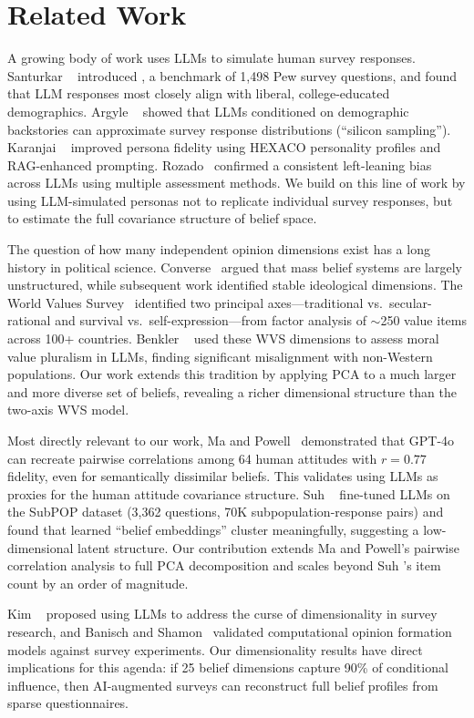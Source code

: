 \section{Related Work}
\label{sec:related}

A growing body of work uses LLMs to simulate human survey responses.
Santurkar \etal~\cite{santurkar2023whose} introduced \opinionqa, a benchmark of 1,498 Pew survey questions, and found that LLM responses most closely align with liberal, college-educated demographics.
Argyle \etal~\cite{argyle2023out} showed that LLMs conditioned on demographic backstories can approximate survey response distributions (``silicon sampling'').
Karanjai \etal~\cite{karanjai2025synthesizing} improved persona fidelity using HEXACO personality profiles and RAG-enhanced prompting.
Rozado~\cite{rozado2025measuring} confirmed a consistent left-leaning bias across LLMs using multiple assessment methods.
We build on this line of work by using LLM-simulated personas not to replicate individual survey responses, but to estimate the full covariance structure of belief space.

The question of how many independent opinion dimensions exist has a long history in political science.
Converse~\cite{converse1964nature} argued that mass belief systems are largely unstructured, while subsequent work identified stable ideological dimensions.
The World Values Survey~\cite{inglehart2005modernization} identified two principal axes---traditional vs.\ secular-rational and survival vs.\ self-expression---from factor analysis of $\sim$250 value items across 100+ countries.
Benkler \etal~\cite{benkler2023assessing} used these WVS dimensions to assess moral value pluralism in LLMs, finding significant misalignment with non-Western populations.
Our work extends this tradition by applying PCA to a much larger and more diverse set of \nbeliefs beliefs, revealing a richer dimensional structure than the two-axis WVS model.

Most directly relevant to our work, Ma and Powell~\cite{ma2025llm} demonstrated that GPT-4o can recreate pairwise correlations among 64 human attitudes with $r = 0.77$ fidelity, even for semantically dissimilar beliefs. This validates using LLMs as proxies for the human attitude covariance structure.
Suh \etal~\cite{suh2025language} fine-tuned LLMs on the SubPOP dataset (3,362 questions, 70K subpopulation-response pairs) and found that learned ``belief embeddings'' cluster meaningfully, suggesting a low-dimensional latent structure.
Our contribution extends Ma and Powell's pairwise correlation analysis to full PCA decomposition and scales beyond Suh \etal's item count by an order of magnitude.

Kim \etal~\cite{kim2023aiaugmented} proposed using LLMs to address the curse of dimensionality in survey research, and Banisch and Shamon~\cite{banisch2022validating} validated computational opinion formation models against survey experiments.
Our dimensionality results have direct implications for this agenda: if 25 belief dimensions capture 90\% of conditional influence, then AI-augmented surveys can reconstruct full belief profiles from sparse questionnaires.

